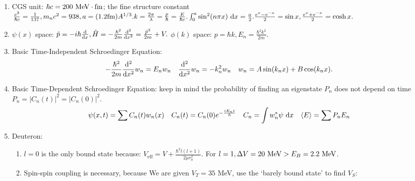 \documentclass{school-22.101-notes}
\begin{document}
\clearpage
{}
\begin{enumerate}
\item CGS unit: $\hbar c = 200 \mbox{ } \mathrm{MeV} \cdot \mathrm{fm}$; the fine structure constant $\frac{e^2}{\hbar c} = \frac{1}{137}, m_n c^2 = 938, a=(1.2 \mathrm{fm}) A^{1/3}. k = \frac{2\pi}{\lambda} = \frac{p}{\hbar} = \frac{E}{\hbar c}. \int_0^a \sin^2 (n \pi x) \mbox{ }\mathrm{d} x = \frac{a}{2}. \frac{e^x - e^{-x} }{2} = \sin x, \frac{e^x + e^{-x}}{2} = \cosh x.$
\item $\psi(x)$ space: $\hat{p} = - i \hbar \frac{\mathrm{d}}{\mathrm{d}x}, \hat{H} = - \frac{\hbar^2}{2m} \frac{\mathrm{d}^{2}}{\mathrm{d}x^{2}} = \frac{\hat{p}^2}{2m} + V.$ $\phi(k)$ space: $p = \hbar k, E_n = \frac{\hbar^2 k^2}{2m}$. 
\item Basic Time-Independent Schroedinger Equation:
\begin{align}
- \frac{\hbar^2}{2m} \frac{\mathrm{d}^{2}}{\mathrm{d}x^{2}} w_n &= E_n w_n & \frac{\mathrm{d}^{2}}{\mathrm{d}x^{2}} w_n &= - k_n^2 w_n & w_n &= A \sin (k_n x) + B \cos (k_n x).
\end{align}
\item Basic Time-Dependent Schroedinger Equation: keep in mind the probability of finding an eigenstate $P_n$ does not depend on time $P_n = |C_n (t)|^2 = |C_n (0)|^2$. 
\begin{align}
\psi(x,t) &= \displaystyle\sum C_n (t) w_n (x) & C_n (t) &= C_n (0) e^{-\frac{i E_n t}{\hbar}}  & C_n &= \int w_n^* \psi \mbox{ }\mathrm{d} x  & \left< E \right> &= \displaystyle\sum P_n E_n 
\end{align}
\item Deuteron:
    \begin{enumerate}
    \item $l=0$ is the only bound state because: $V_{\mathrm{eff}} = V + \frac{\hbar^2 l(l+1)}{2 \mu r_0^2}$. 
    For $l=1, \Delta V = 20 \mbox{ } \mathrm{MeV} > E_B = 2.2 \mbox{ } \mathrm{MeV}$.
    \item Spin-spin coupling is necessary, because 
    We are given $V_T = 35$ MeV, use the `barely bound state' to find $V_S$: 

\end{enumerate}
\end{enumerate}
\end{document}
